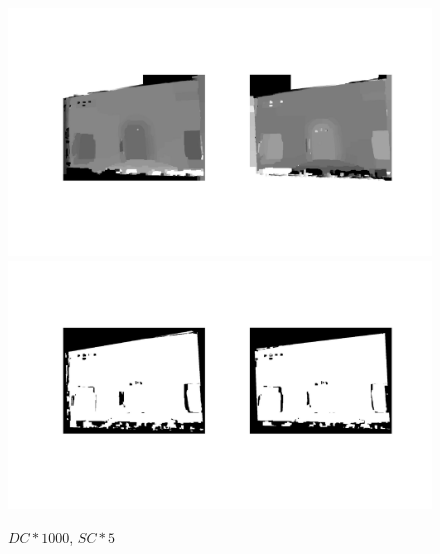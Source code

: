 \documentclass[12pt]{article}
\begin{document}
\begin{figure}[H]
	\centering
	\includegraphics[width=1.1\textwidth]{gc_1000_5_1.jpg}
	\includegraphics[width=1.1\textwidth]{gc_1000_5_2.jpg}
	\caption{$DC*1000$, $SC*5$}
	\label{fig1}
\end{figure}
\end{document}
